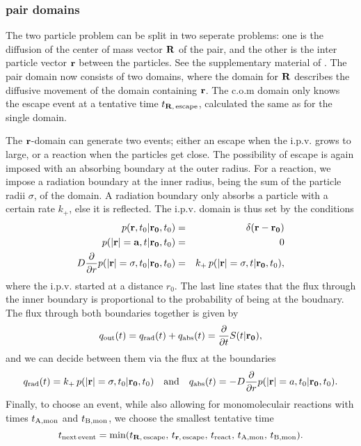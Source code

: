 \subsubsection{pair domains}
The two particle problem can be split in two seperate problems: one is the diffusion of the center of mass vector ${\bf R}$ of the pair, and the other is the inter particle vector ${\bf r}$ between the particles. See the supplementary material of \cite{Takahashi2010}. The pair domain now consists of two domains, where the domain for ${\bf R}$ describes the diffusive movement of the domain containing ${\bf r}$. The c.o.m domain only knows the escape event at a tentative time $t_{{\bf R},\,{\rm escape}}$, calculated the same as for the single domain. 

The ${\bf r}$-domain can generate two events; either an escape when the i.p.v. grows to large, or a reaction when the particles get close. The possibility of escape is again imposed with an absorbing boundary at the outer radius. For a reaction, we impose a radiation boundary at the inner radius, being the sum of the particle radii $\sigma$, of the domain. A radiation boundary only absorbs a particle with a certain rate $k_+$, else it is reflected. The i.p.v. domain is thus set by the conditions
\setlength{\jot}{10pt}
\begin{eqnarray}
 p({\bf r}, t_0|{\bf r_0},t_0) & = & \delta(\mathbf{r - r_0}) \\
 p({\bf |r|=a}, t|{\bf r_0},t_0) & = & 0 \\
 D \frac{\partial }{\partial r} p({\bf |r|}=\sigma, t_0|{\bf r_0},t_0) & = & k_+\,p({\bf |r|}=\sigma, t|{\bf r_0},t_0),
\end{eqnarray}
where the i.p.v. started at a distance $r_0$. The last line states that the flux through the inner boundary is proportional to the probability of being at the boudnary. The flux through both boundaries together is given by
\begin{equation}
 q_{\rm out}(t) = q_{\rm rad}(t) + q_{\rm abs}(t) = \frac{\partial }{\partial t} S(t|{\bf r_0}),
\end{equation}
and we can decide between them via the flux at the boundaries
\begin{equation}
q_{\rm rad}(t) = k_+ \, p({\bf |r|}=\sigma, t_0|{\bf r_0},t_0) \quad{\rm and}\quad q_{\rm abs}(t) = - D \frac{\partial }{\partial r} p({\bf |r|}=a, t_0|{\bf r_0},t_0).
\end{equation}
Finally, to choose an event, while also allowing for monomoleculair reactions with times $t_{\rm A, mon}$ and $t_{\rm B, mon}$, we choose the smallest tentative time
\begin{equation}
 t_{\rm next\,event} = {\rm min}(t_{{\bf R},\,{\rm escape}},\,t_{{\bf r},\,{\rm escape}},\,t_{\rm react},\,t_{\rm A, mon},\,t_{\rm B, mon}).
\end{equation}

